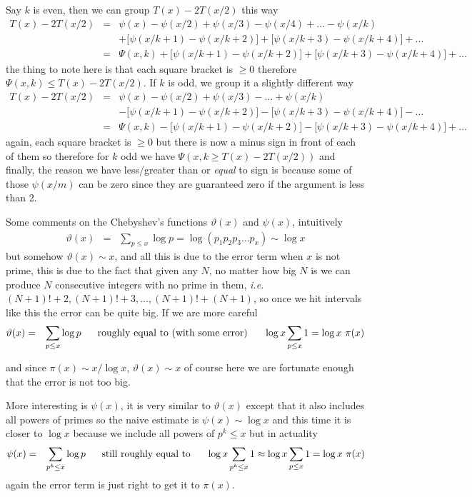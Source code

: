 \documentclass[aps,preprint,preprintnumbers,nofootinbib,showpacs,prd]{revtex4-1}
\newcommand{\ie}{{\it i.e.} }
\newcommand{\nbea}{\begin{eqnarray*}}
\newcommand{\neea}{\end{eqnarray*}}
\begin{document}
Say $k$ is even, then we can group $T(x) - 2T(x/2)$ this way
%
\nbea
T(x) - 2T(x/2) & = & \psi(x) - \psi(x/2) + \psi(x/3) - \psi(x/4) + \dots - \psi(x/k) \\
&& + \lbrack\psi(x/k+1) - \psi(x/k+2)\rbrack + \lbrack\psi(x/k+3) - \psi(x/k+4)\rbrack + \dots \\
& = & \Psi(x,k) + \lbrack\psi(x/k+1) - \psi(x/k+2)\rbrack + \lbrack\psi(x/k+3) - \psi(x/k+4)\rbrack + \dots
\neea
%
the thing to note here is that each square bracket is $\ge 0$ therefore $\Psi(x,k) \le T(x) - 2T(x/2)$. If $k$ is odd, we group it a slightly different way
%
\nbea
T(x) - 2T(x/2) & = & \psi(x) - \psi(x/2) + \psi(x/3) - \dots + \psi(x/k) \\
&& - \lbrack\psi(x/k+1) - \psi(x/k+2)\rbrack - \lbrack\psi(x/k+3) - \psi(x/k+4)\rbrack - \dots \\
& = & \Psi(x,k) - \lbrack\psi(x/k+1) - \psi(x/k+2)\rbrack - \lbrack\psi(x/k+3) - \psi(x/k+4)\rbrack + \dots
\neea
%
again, each square bracket is $\ge 0$ but there is now a minus sign in front of each of them so therefore for $k$ odd we have $\Psi(x,k \ge T(x) - 2T(x/2))$ and finally, the reason we have less/greater than or {\it equal} to sign is because some of those $\psi(x/m)$ can be zero since they are guaranteed zero if the argument is less than 2.



Some comments on the Chebyshev's functions $\vartheta(x)$ and $\psi(x)$, intuitively
%
\nbea
\vartheta(x) & = & \sum_{p \le x} \log p = \log(p_1 p_2 p_3 \dots p_x) \sim \log x
\neea
%
but somehow $\vartheta(x) \sim x$, and all this is due to the error term when $x$ is not prime, this is due to the fact that given any $N$, no matter how big $N$ is we can produce $N$ consecutive integers with no prime in them, \ie $(N+1)! + 2, (N+1)! + 3, \dots,  (N+1)! + (N+1)$, so once we hit intervals like this the error can be quite big. If we are more careful
%
\nbea
\vartheta(x) & = & \sum_{p \le x} \log p ~~~~~{\rm roughly~equal~to~(with~some~error)}~~~~~ \log x \sum_{p \le x} 1 = \log x ~ \pi (x)
\neea
%

and since $\pi(x) \sim x/\log x$, $\vartheta(x) \sim x$ of course here we are fortunate enough that the error is not too big.

More interesting is $\psi(x)$, it is very similar to $\vartheta(x)$ except that it also includes all powers of primes so the naive estimate is $\psi(x) \sim \log x$ and this time it is closer to $\log x$ because we include all powers of $p^k \le x$ but in actuality
%
\nbea
\psi(x) & = & \sum_{p^k \le x} \log p ~~~~~ {\rm still~roughly~equal~to} ~~~~~ \log x \sum_{p^k \le x} 1 \approx \log x \sum_{p \le x} 1 = \log x ~ \pi(x)
\neea
%
again the error term is just right to get it to $\pi(x)$.
\end{document}
